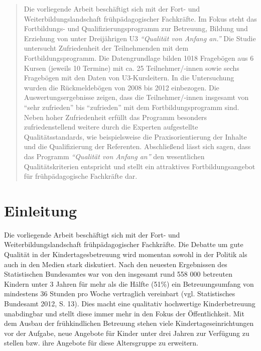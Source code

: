\documentclass[12pt,a4paper]{article}
\begin{document}
\begin{abstract}
Die vorliegende Arbeit beschäftigt sich mit der Fort- und Weiterbildungslandschaft frühpädagogischer Fachkräfte. Im Fokus steht das Fortbildungs- und Qualifizierungsprogramm zur Betreuung, Bildung und Erziehung von unter Dreijährigen U3 \textit{ "`Qualität von Anfang an."'} Die Studie untersucht Zufriedenheit der Teilnehmenden mit dem Fortbildungsprogramm.
Die Datengrundlage bilden 1018 Fragebögen aus 6 Kursen (jeweils 10 Termine) mit ca. 25 Teilnehmer/-innen sowie sechs Fragebögen mit den Daten von U3-Kursleitern. In die Untersuchung wurden die Rückmeldebögen von 2008 bis 2012 einbezogen.
Die Auswertungsergebnisse zeigen, dass die Teilnehmer/-innen insgesamt von "`sehr zufrieden"' bis "`zufrieden"' mit dem Fortbildungsprogramm sind. Neben hoher Zufriedenheit erfüllt das Programm besonders zufriedenstellend weitere durch die Experten aufgestellte Qualitätsstandards, wie beispielsweise die Praxisorientierung der Inhalte und die Qualifizierung der Referenten. Abschließend lässt sich sagen, dass das Programm \textit{"`Qualität von Anfang an"'} den wesentlichen  Qualitätskriterien entspricht und stellt ein attraktives Fortbildungsangebot für frühpädagogische Fachkräfte dar.

\end{abstract}

\pagebreak

\tableofcontents

\pagebreak

\section{Einleitung}

Die vorliegende Arbeit beschäftigt sich mit der Fort- und Weiterbildungslandschaft frühpädagogischer Fachkräfte. Die Debatte um gute Qualität in der Kindertagesbetreuung wird momentan sowohl in der Politik als auch in den Medien stark diskutiert. Nach den neuesten Ergebnissen des Statistischen Bundesamtes war von den insgesamt rund 558 000 betreuten Kindern unter 3 Jahren für mehr als die Hälfte (51\%) ein Betreuungsumfang von mindestens 36 Stunden pro Woche vertraglich vereinbart (vgl. Statistisches Bundesamt 2012, S. 13). Dies macht eine qualitativ hochwertige Kinderbetreuung unabdingbar und stellt diese immer mehr in den Fokus der Öffentlichkeit. Mit dem Ausbau der frühkindlichen Betreuung stehen viele Kindertageseinrichtungen vor der Aufgabe, neue Angebote für Kinder unter drei Jahren zur Verfügung zu stellen bzw. ihre Angebote für diese Altersgruppe zu erweitern.
\end{document}
